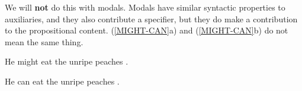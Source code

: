 \documentclass[11pt,a4paper]{article}
\begin{document}
\begin{figure}[ht]
\begin{minipage}[t]{0.45\linewidth}
{{   }
}

\end{minipage}

\hspace*{\fill}
\caption{}\label{he was eating the ripe peaches .}
\end{figure}


We will \textbf{not} do this with modals. Modals have similar syntactic
properties to auxiliaries, and they also contribute a specifier, but
they do make a contribution to the propositional
content. (\ref{MIGHT-CAN}a) and  (\ref{MIGHT-CAN}b) do not mean the
same thing.

\begin{examples}
\item \label{MIGHT-CAN}
\begin{examples}
\item He might eat the unripe peaches .
\item He can eat the unripe peaches .
\end{examples}
\end{examples}
\end{document}

